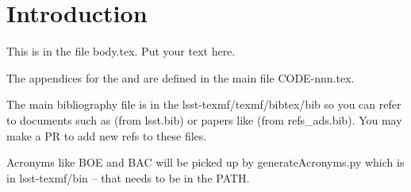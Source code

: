 \section{Introduction} \label{sec:intro}
This is in the file body.tex. Put your text here.

The appendices for the  and  are defined in the main file CODE-nnn.tex.

The main bibliography file is in the lsst-texmf/texmf/bibtex/bib so you can refer to documents such as  (from lsst.bib)  or papers like \cite{2008arXiv0805.2366I} (from refs\_ads.bib). You may make a \gls{PR} to add new refs to these files.

Acronyms like \gls{BOE} and \gls{BAC} will be picked up by generateAcronyms.py which is in lsst-texmf/bin -- that needs to be in the PATH.
